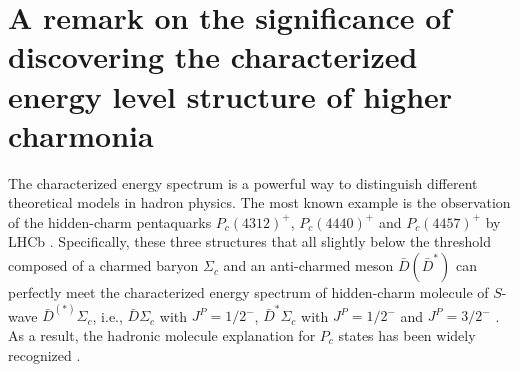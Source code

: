 \documentclass[final,5p,times,twocolumn]{elsarticle}
\begin{document}
\begin{table}[h]
\caption{The comparison of the three-body decay width using the constant width $\Gamma_0$ and invariant mass-dependent width $\Gamma(q^2)$ for the intermediate excited charmed meson. The results are in units of MeV.  \label{tab:com}}
\end{table}


\section{A remark on the significance of discovering the characterized energy level structure of higher charmonia}

The characterized energy spectrum is a powerful way to distinguish different theoretical models in hadron physics. The most known example is the observation of the hidden-charm pentaquarks $P_c(4312)^+$, $P_c(4440)^+$ and $P_c(4457)^+$ by LHCb \cite{LHCb:2019kea}. Specifically, these three structures that all slightly below the threshold composed of a charmed baryon $\Sigma_c$ and an anti-charmed meson $\bar{D}(\bar{D}^{*}) $ can perfectly meet the characterized energy spectrum of  hidden-charm molecule of $S$-wave $\bar{D}^{(*)}\Sigma_c$, i.e., $\bar{D}\Sigma_c$ with $J^P=1/2^-$, $\bar{D}^*\Sigma_c$ with $J^P=1/2^-$ and $J^P=3/2^-$ \cite{Wu:2010jy,Wang:2011rga,Yang:2011wz,Uchino:2015uha,Karliner:2015ina,Chen:2022asf}.  As a result, the hadronic molecule explanation for $P_c$ states has been widely recognized \cite{Chen:2022asf}. 
\end{document}
